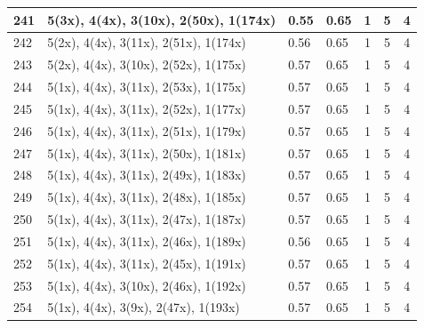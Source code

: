\begin{small}
\begin{longtable}{|p{0.5cm}|p{9cm}|p{1.3cm}|p{1.3cm}|c|c|c|}
  241 & 5(3x), 4(4x), 3(10x), 2(50x), 1(174x) & \cellcolor{colorOK}  0.55 & \cellcolor{colorOK} 0.65 & 1 & 5 & \cellcolor{colorGood} 4 \\   \hline
  242 & 5(2x), 4(4x), 3(11x), 2(51x), 1(174x) & \cellcolor{colorOK}  0.56 & \cellcolor{colorOK} 0.65 & 1 & 5 & \cellcolor{colorGood} 4 \\   \hline
  243 & 5(2x), 4(4x), 3(10x), 2(52x), 1(175x) & \cellcolor{colorOK}  0.57 & \cellcolor{colorOK} 0.65 & 1 & 5 & \cellcolor{colorGood} 4 \\   \hline
  244 & 5(1x), 4(4x), 3(11x), 2(53x), 1(175x) & \cellcolor{colorOK}  0.57 & \cellcolor{colorOK} 0.65 & 1 & 5 & \cellcolor{colorGood} 4 \\   \hline
  245 & 5(1x), 4(4x), 3(11x), 2(52x), 1(177x) & \cellcolor{colorOK}  0.57 & \cellcolor{colorOK} 0.65 & 1 & 5 & \cellcolor{colorGood} 4 \\   \hline
  246 & 5(1x), 4(4x), 3(11x), 2(51x), 1(179x) & \cellcolor{colorOK}  0.57 & \cellcolor{colorOK} 0.65 & 1 & 5 & \cellcolor{colorGood} 4 \\   \hline
  247 & 5(1x), 4(4x), 3(11x), 2(50x), 1(181x) & \cellcolor{colorOK}  0.57 & \cellcolor{colorOK} 0.65 & 1 & 5 & \cellcolor{colorGood} 4 \\   \hline
  248 & 5(1x), 4(4x), 3(11x), 2(49x), 1(183x) & \cellcolor{colorOK}  0.57 & \cellcolor{colorOK} 0.65 & 1 & 5 & \cellcolor{colorGood} 4 \\   \hline
  249 & 5(1x), 4(4x), 3(11x), 2(48x), 1(185x) & \cellcolor{colorOK}  0.57 & \cellcolor{colorOK} 0.65 & 1 & 5 & \cellcolor{colorGood} 4 \\   \hline
  250 & 5(1x), 4(4x), 3(11x), 2(47x), 1(187x) & \cellcolor{colorOK}  0.57 & \cellcolor{colorOK} 0.65 & 1 & 5 & \cellcolor{colorGood} 4 \\   \hline
  251 & 5(1x), 4(4x), 3(11x), 2(46x), 1(189x) & \cellcolor{colorOK}  0.56 & \cellcolor{colorOK} 0.65 & 1 & 5 & \cellcolor{colorGood} 4 \\   \hline
  252 & 5(1x), 4(4x), 3(11x), 2(45x), 1(191x) & \cellcolor{colorOK}  0.57 & \cellcolor{colorOK} 0.65 & 1 & 5 & \cellcolor{colorGood} 4 \\   \hline
  253 & 5(1x), 4(4x), 3(10x), 2(46x), 1(192x) & \cellcolor{colorOK}  0.57 & \cellcolor{colorOK} 0.65 & 1 & 5 & \cellcolor{colorGood} 4 \\   \hline
  254 & 5(1x), 4(4x), 3(9x), 2(47x), 1(193x) & \cellcolor{colorOK}  0.57 & \cellcolor{colorOK} 0.65 & 1 & 5 & \cellcolor{colorGood} 4 \\   \hline

\end{longtable}
\end{small}
